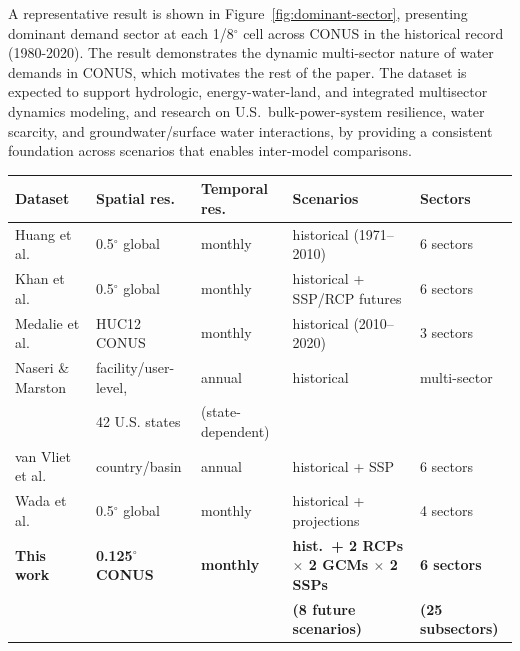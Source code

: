 \documentclass[fleqn,10pt]{wlscirep}
\begin{document}
A representative result is shown in Figure~\ref{fig:dominant-sector}, presenting dominant demand sector at each 1/8$^{\circ}$ cell across CONUS in the historical record (1980-2020). The result demonstrates the dynamic multi-sector nature of water demands in CONUS, which motivates the rest of the paper. The dataset is expected to support hydrologic, energy-water-land, and integrated multisector dynamics modeling, and research on U.S.\ bulk-power-system resilience, water scarcity, and groundwater/surface water interactions, by providing a consistent foundation across scenarios that enables inter-model comparisons. 


\begin{table}[!ht]
\centering
\small
\begin{tabular}{lllll}
\toprule
\textbf{Dataset} & \textbf{Spatial res.} & \textbf{Temporal res.} & \textbf{Scenarios} & \textbf{Sectors} \\
\midrule
Huang et al.\cite{Huang2018}                   & 0.5$^{\circ}$ global & monthly & historical (1971--2010) & 6 sectors \\
Khan et al.\cite{Khan2023}    & 0.5$^{\circ}$ global & monthly & historical + SSP/RCP futures & 6 sectors \\
Medalie et al.\cite{Stets2025USGS}             & HUC12 CONUS & monthly & historical (2010--2020) & 3 sectors \\
Naseri \& Marston\cite{naseri2025united}       & facility/user-level, & annual & historical & multi-sector  \\
                                               & 42 U.S. states & (state-dependent) &  &   \\
van Vliet et al.\cite{van_Vliet_2021}          & country/basin & annual & historical + SSP & 6 sectors \\
Wada et al.\cite{Wada_2017}                    & 0.5$^{\circ}$ global & monthly & historical + projections & 4 sectors \\
\textbf{This work}                             & \textbf{0.125$^{\circ}$ CONUS} & \textbf{monthly} & \textbf{hist.\ + 2 RCPs $\times$ 2 GCMs $\times$ 2 SSPs} & \textbf{6 sectors} \\
                                               &                                &                  & \textbf{(8 future scenarios)}                                & \textbf{(25 subsectors)} \\
                                               

\end{tabular}
\end{table}
\end{document}
